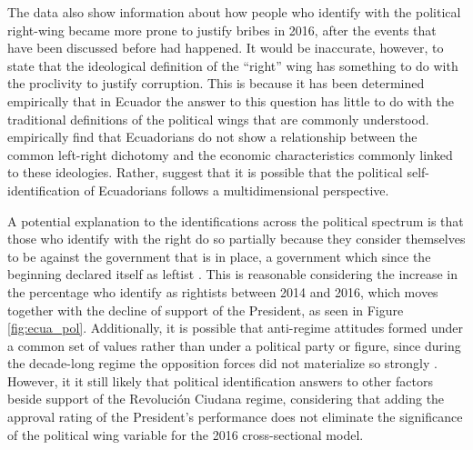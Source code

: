 \documentclass[floatsintext,man]{apa7}\usepackage[]{graphicx}\usepackage[]{color}
\begin{document}
The data also show information about how people who identify with the political right-wing became more prone to justify bribes in 2016, after the events that have been discussed before had happened. It would be inaccurate, however, to state that the ideological definition of the \enquote{right} wing has something to do with the proclivity to justify corruption. This is because it has been determined empirically that in Ecuador the answer to this question has little to do with the traditional definitions of the political wings that are commonly understood. \textcite{Moncagatta.2020b} empirically find that Ecuadorians do not show a relationship between the common left-right dichotomy and the economic characteristics commonly linked to these ideologies. Rather, \textcite{Moncagatta.2020b} suggest that it is possible that the political self-identification of Ecuadorians follows a multidimensional perspective. 

A potential explanation to the identifications across the political spectrum is that those who identify with the right do so partially because they consider themselves to be against the government that is in place, a government which since the beginning declared itself as leftist \parencite{Ortiz.2013}. This is reasonable considering the increase in the percentage who identify as rightists between 2014 and 2016, which moves together with the decline of support of the President, as seen in Figure \ref{fig:ecua_pol}. Additionally, it is possible that anti-regime attitudes formed under a common set of values rather than under a political party or figure, since during the decade-long regime the opposition forces did not materialize so strongly \parencite{Melendez.2017}. However, it it still likely that political identification answers to other factors beside support of the Revolución Ciudana regime, considering that adding the approval rating of the President's performance does not eliminate the significance of the political wing variable for the 2016 cross-sectional model.
\end{document}
